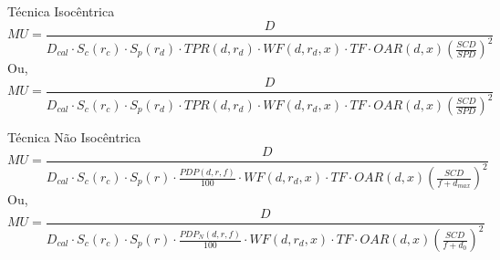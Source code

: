 \documentclass[11pt,a4paper]{article}
\begin{document}
    Técnica Isocêntrica
        \begin{equation}
            MU = \frac{D}{D_{cal} \cdot S_c(r_c) \cdot S_p(r_d) \cdot TPR(d, r_d) \cdot 
            WF(d, r_d, x) \cdot TF \cdot OAR(d, x) \left(\frac{SCD}{SPD}\right)^2}
            \label{eq:muTpr}
        \end{equation}
    Ou,
        \begin{equation}
            MU = \frac{D}{D_{cal} \cdot S_c(r_c) \cdot S_p(r_d) \cdot TPR(d, r_d) \cdot 
            WF(d, r_d, x) \cdot TF \cdot OAR(d, x) \left(\frac{SCD}{SPD}\right)^2}
            \label{eq:muTmr}
        \end{equation}  

    

    Técnica Não Isocêntrica
        \begin{equation}
            MU = \frac{D}{D_{cal} \cdot S_c(r_c) \cdot S_p(r) \cdot \frac{PDP(d, r, f)}{100} \cdot WF(d, r_d, x) \cdot TF \cdot OAR(d, x) \left(\frac{SCD}{f + d_{max}}\right)^2}
            \label{eq:mupdpdmax}
        \end{equation}  
    Ou,
        \begin{equation}
            MU = \frac{D}{D_{cal} \cdot S_c(r_c) \cdot S_p(r) \cdot \frac{PDP_N(d, r, f)}{100} \cdot WF(d, r_d, x) \cdot TF \cdot OAR(d, x) \left(\frac{SCD}{f + d_{0}}\right)^2}
            \label{eq:mupdpdref}
        \end{equation}  
    
\end{document}

